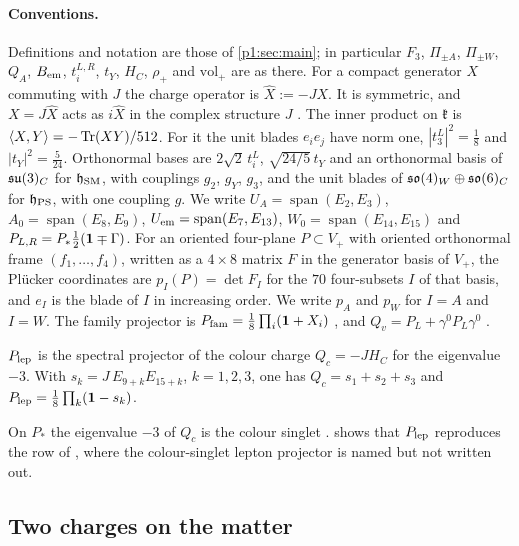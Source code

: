 \paragraph{Conventions.} Definitions and notation are those of \cref{p1:sec:main}; in particular $F_3$, $\Pi_{\pm A}$, $\Pi_{\pm W}$, $Q_A$, $B_{\rm em}$, $t^{L,R}_i$,
$t_Y$, $H_C$, $\rho_+$ and $\mathrm{vol}_+$ are as there. For a compact generator $X$ commuting with $J$ the charge operator is $\hat X:=-JX$. It is symmetric, and
$X=J\hat X$ acts as $i\hat X$ in the complex structure $J$ \cite[Section~8]{ES17}. The inner product on $\mathfrak k$ is $\langle X,Y\rangle=-\operatorname{Tr}(XY)/512$. For it the unit
blades $e_ie_j$ have norm one, $|t^L_3|^2=\tfrac18$ and $|t_Y|^2=\tfrac5{24}$. Orthonormal bases are $2\sqrt2\,t^L_i$, $\sqrt{24/5}\,t_Y$ and an orthonormal basis of
$\mathfrak{su}(3)_C$ for $\mathfrak h_{\rm SM}$, with couplings $g_2$, $g_Y$, $g_3$, and the unit blades of $\mathfrak{so}(4)_W\oplus\mathfrak{so}(6)_C$ for $\mathfrak h_{\rm PS}$, with one coupling
$g$. We write $U_A=\operatorname{span}(E_2,E_3)$, $A_0=\operatorname{span}(E_8,E_9)$, $U_{\rm em}=\operatorname{span}(E_7,E_{13})$, $W_0=\operatorname{span}(E_{14},E_{15})$
and $P_{L,R}=P_*\tfrac12(\mathbf 1\mp\Gamma)$. For an oriented four-plane $P\subset V_+$ with oriented orthonormal frame $(f_1,\dots,f_4)$, written as a $4\times8$ matrix $F$ in
the generator basis of $V_+$, the Plücker coordinates are $p_I(P)=\det F_I$ for the $70$ four-subsets $I$ of that basis, and $e_I$ is the blade of $I$ in increasing
order. We write $p_A$ and $p_W$ for $I=A$ and $I=W$. The family projector is $P_{\rm fam}=\tfrac18\prod_i(\mathbf 1+X_i)$ \cite[Section~7]{ES17}, and
$Q_v=P_L+\gamma^0P_L\gamma^0$ \cite[Prop.~21.6]{ES17}.

\begin{definition}
\label{p3:def:plep}
$P_{\rm lep}$ is the spectral projector of the colour charge $Q_c=-JH_C$ for the eigenvalue $-3$. With $s_k=J\,E_{9+k}E_{15+k}$, $k=1,2,3$, one has
$Q_c=s_1+s_2+s_3$ and $P_{\rm lep}=\tfrac18\prod_k(\mathbf 1-s_k)$.
\end{definition}

On $P_*$ the eigenvalue $-3$ of $Q_c$ is the colour singlet \cite[Prop.~8.4]{ES17}.  shows that $P_{\rm lep}$ reproduces the row of
\cite[Prop.~21.6]{ES17}, where the colour-singlet lepton projector is named but not written out.

\subsection{Two charges on the matter}
\label{p3:sec:charges}

